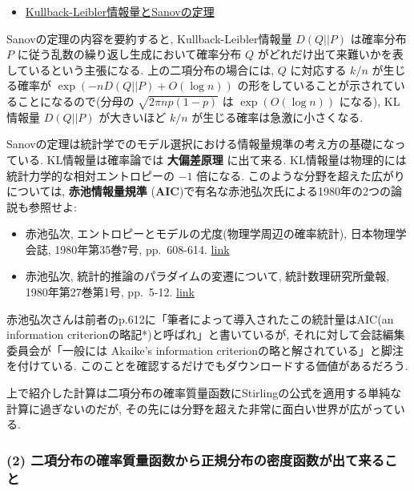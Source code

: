 \documentclass[10pt, a4paper,xelatex,ja=standard]{bxjsarticle}
\providecommand{\tightlist}{%
      \setlength{\itemsep}{0pt}\setlength{\parskip}{0pt}}
\begin{document}
\begin{itemize}
\tightlist
\item
  \href{https://genkuroki.github.io/documents/20160616KullbackLeibler.pdf}{Kullback-Leibler情報量とSanovの定理}
\end{itemize}

Sanovの定理の内容を要約すると, Kullback-Leibler情報量 \(D(Q||P)\)
は確率分布 \(P\) に従う乱数の繰り返し生成において確率分布 \(Q\)
がどれだけ出て来難いかを表しているという主張になる.
上の二項分布の場合には, \(Q\) に対応する \(k/n\) が生じる確率が
\(\exp(-nD(Q||P)+O(\log n))\)
の形をしていることが示されていることになるので(分母の
\(\sqrt{2\pi np(1-p)}\) は \(\exp(O(\log n))\) になる), KL情報量
\(D(Q||P)\) が大きいほど \(k/n\) が生じる確率は急激に小さくなる.

Sanovの定理は統計学でのモデル選択における情報量規準の考え方の基礎になっている.
KL情報量は確率論では \textbf{大偏差原理} に出て来る.
KL情報量は物理的には統計力学的な相対エントロピーの \(-1\) 倍になる.
このような分野を超えた広がりについては, \textbf{赤池情報量規準}
(\textbf{AIC})で有名な赤池弘次氏による1980年の2つの論説も参照せよ:

\begin{itemize}
\tightlist
\item
  赤池弘次, エントロピーとモデルの尤度(物理学周辺の確率統計),
  日本物理学会誌, 1980年第35巻7号, pp.~608-614.
  \href{https://www.jstage.jst.go.jp/article/butsuri1946/35/7/35_7_608/_article/-char/ja/}{link}
\item
  赤池弘次, 統計的推論のパラダイムの変遷について, 統計数理研究所彙報,
  1980年第27巻第1号, pp.~5-12.
  \href{https://ismrepo.ism.ac.jp/index.php?active_action=repository_view_main_item_detail\&page_id=13\&block_id=21\&item_id=32568\&item_no=1}{link}
\end{itemize}

赤池弘次さんは前者のp.612に「筆者によって導入されたこの統計量はAIC(an
information criterionの略記*)と呼ばれ」と書いているが,
それに対して会誌編集委員会が「一般には Akaike's information
criterionの略と解されている」と脚注を付けている.
このことを確認するだけでもダウンロードする価値があるだろう.

上で紹介した計算は二項分布の確率質量函数にStirlingの公式を適用する単純な計算に過ぎないのだが,
その先には分野を超えた非常に面白い世界が広がっている.

    \hypertarget{ux4e8cux9805ux5206ux5e03ux306eux78baux7387ux8ceaux91cfux51fdux6570ux304bux3089ux6b63ux898fux5206ux5e03ux306eux5bc6ux5ea6ux51fdux6570ux304cux51faux3066ux6765ux308bux3053ux3068}{%
\subsubsection{(2)
二項分布の確率質量函数から正規分布の密度函数が出て来ること}\label{ux4e8cux9805ux5206ux5e03ux306eux78baux7387ux8ceaux91cfux51fdux6570ux304bux3089ux6b63ux898fux5206ux5e03ux306eux5bc6ux5ea6ux51fdux6570ux304cux51faux3066ux6765ux308bux3053ux3068}}
\end{document}
